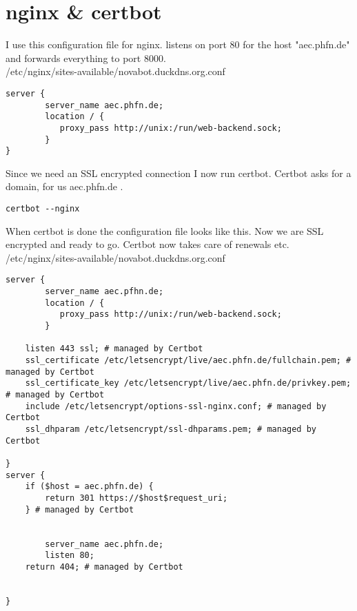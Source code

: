 \section{nginx \& certbot}
I use this configuration file for nginx. listens on port 80
for the host "aec.phfn.de" and forwards everything
to port 8000.\\
/etc/nginx/sites-available/novabot.duckdns.org.conf
\begin{verbatim}
server {
        server_name aec.phfn.de;
        location / {
           proxy_pass http://unix:/run/web-backend.sock;
        }
}
\end{verbatim}
Since we need an SSL encrypted connection I now run certbot.
Certbot asks for a domain, for us aec.phfn.de .
\begin{verbatim}
certbot --nginx
\end{verbatim}
When certbot is done the configuration file looks like this.
Now we are SSL encrypted and ready to go. Certbot now takes
care of renewals etc.\\
/etc/nginx/sites-available/novabot.duckdns.org.conf
\begin{verbatim}
server {
        server_name aec.pfhn.de;
        location / {
           proxy_pass http://unix:/run/web-backend.sock;
        }
 
    listen 443 ssl; # managed by Certbot
    ssl_certificate /etc/letsencrypt/live/aec.phfn.de/fullchain.pem; # managed by Certbot
    ssl_certificate_key /etc/letsencrypt/live/aec.phfn.de/privkey.pem; # managed by Certbot
    include /etc/letsencrypt/options-ssl-nginx.conf; # managed by Certbot
    ssl_dhparam /etc/letsencrypt/ssl-dhparams.pem; # managed by Certbot
 
}
server {
    if ($host = aec.phfn.de) {
        return 301 https://$host$request_uri;
    } # managed by Certbot
 
 
        server_name aec.phfn.de;
        listen 80;
    return 404; # managed by Certbot
 
 
}
\end{verbatim}
